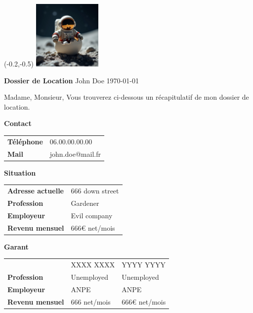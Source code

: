 \newpage
\thispagestyle{empty}


\begin{textblock}{10}(-0.2,-0.5)  %
    \includegraphics[width=0.25\textwidth]{doc/tenant/photo.png}
\end{textblock}

\vspace{0mm}
{\center\color{white} 
{\Huge \textbf{Dossier de Location}}
\newPar
{\Large John Doe}
\newPar
{\Large \today}\\
}
\vspace{40mm}


{\large
Madame, Monsieur,
\newPar
\lipsum[1]
\newPar
Vous trouverez ci-dessous un récapitulatif de mon dossier de location.
\newPar

\lineh

\textbf{Contact}\\
\newPar
\begin{tabularx}{\textwidth}{p{4cm}X}
\textbf{Téléphone} & 06.00.00.00.00\\
\textbf{Mail} & john.doe@mail.fr
\end{tabularx}
\newPar

\lineh

\textbf{Situation}\\
\newPar
\begin{tabularx}{\textwidth}{p{4cm}X}
\textbf{Adresse actuelle} & 666 down street\\
\textbf{Profession} & Gardener\\
\textbf{Employeur} & Evil company\\
\textbf{Revenu mensuel} & 666€ net/mois
\end{tabularx}
\newPar

\lineh

\textbf{Garant}
\newPar
\begin{tabularx}{\textwidth}{p{4cm}XX}
& XXXX XXXX & YYYY YYYY\\
\textbf{Profession} & Unemployed & Unemployed\\
\textbf{Employeur} & ANPE & ANPE\\
\textbf{Revenu mensuel} & 666 net/mois & 666€ net/mois\\
\end{tabularx}
}
